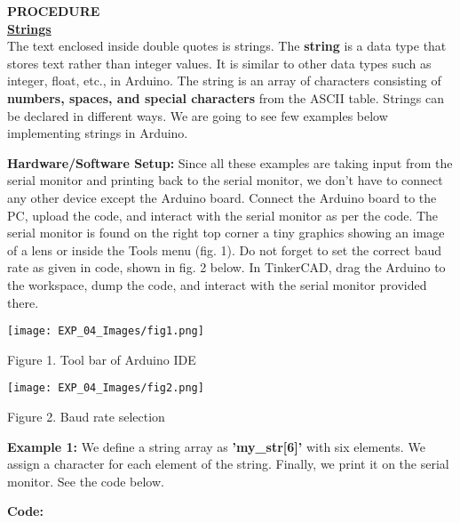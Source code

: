 \documentclass[12pt,a4paper]{article}
\begin{document}
\begin{justify}
\vspace{2cm}
\noindent \textbf{\large PROCEDURE}\\[3pt]
\textbf {\underline {Strings}}\\[3pt]
The text enclosed inside double quotes is strings. The \textbf {string} is a data type that stores text rather than integer values. It is similar to other data types such as integer, float, etc., in Arduino. The string is an array of characters consisting of \textbf {numbers, spaces, and special characters} from the ASCII table.
Strings can be declared in different ways. We are going to see few examples below implementing strings in Arduino.\par
\noindent \textbf{Hardware/Software Setup:} Since all these examples are taking input from the serial monitor and printing back to the serial monitor, we don't have to connect any other device except the Arduino board. Connect the Arduino board to the PC, upload the code, and interact with the serial monitor as per the code. The serial monitor is found on the right top corner a tiny graphics showing an image of a lens or inside the Tools menu (fig. 1). Do not forget to set the correct baud rate as given in code, shown in fig. 2 below. In TinkerCAD, drag the Arduino to the workspace, dump the code, and interact with the serial monitor provided there.
\vspace{-3mm}
\begin{center} 
\texttt{[image: EXP\_04\_Images/fig1.png]}
\end{center}
\vspace{-7mm}
\begin{center} {Figure 1. Tool bar of Arduino IDE}\end{center}
\vspace{-3mm}
\begin{center} 
\texttt{[image: EXP\_04\_Images/fig2.png]}
\end{center}
\vspace{-7mm}
\begin{center} {Figure 2. Baud rate selection}\end{center}
\vspace{-3mm}
\noindent \textbf{Example 1:} We define a string array as \textbf{'my\_str[6]'} with six elements. We assign a character for each element of the string. Finally, we print it on the serial monitor. See the code below.
\end{justify}
\vspace{-5mm}
\hspace{1.5cm}\textbf{\large Code:}\\[6pt]
\setlength{\parindent}{8eM}
\end{document}
